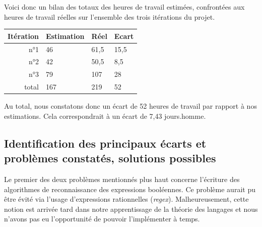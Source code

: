 \documentclass[12pt,a4paper,titlepage,openany, oneside]{report}
\begin{document}
    Voici donc un bilan des totaux des heures de travail estimées, confrontées aux heures
    de travail réelles sur l'ensemble des trois itérations du projet.

    \begin{center}
        \begin{tabular}{|r|l|l|l|}
            \hline
            Itération & Estimation & Réel & Ecart\\
            \hline
            n°1       &  46        & 61,5   & 15,5    \\
            \hline
            n°2       &  42        & 50,5 & 8,5  \\
            \hline
            n°3       &  79      & 107   & 28 \\
            \hline
            total     &  167      & 219  & 52 \\
            \hline
        \end{tabular}
    \end{center}

    Au total, nous constatons donc un écart de 52 heures de travail par rapport à nos
    estimations. Cela correspondrait à un écart de 7,43 jours.homme.




    \subsection{Identification des principaux écarts et problèmes constatés, solutions possibles}

    Le premier des deux problèmes mentionnés plus haut concerne l'écriture des
    algorithmes de reconnaissance des expressions booléennes. Ce problème aurait pu
    être évité via l'usage d'expressions rationnelles (\emph{regex}). Malheureusement,
    cette notion est arrivée tard dans notre apprentissage de la théorie des langages et
    nous n'avons pas eu l'opportunité de pouvoir l'implémenter à temps.
\end{document}
